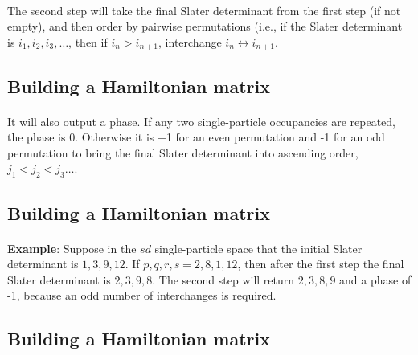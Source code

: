 \paragraph{}
The second step will take the final Slater determinant 
from the first step (if not empty),
and then order by pairwise permutations (i.e., if the Slater determinant is
$i_1, i_2, i_3, \ldots$, then if $i_n > i_{n+1}$, interchange 
$i_n \leftrightarrow i_{n+1}$.



\subsection*{Building a Hamiltonian matrix}

\paragraph{}

It will also output a phase.  If any two single-particle occupancies are repeated, 
the phase is
0.  Otherwise it is +1 for an even permutation and -1 for an odd permutation to 
bring the final
Slater determinant into ascending order, $j_1 < j_2 < j_3 \ldots$.



\subsection*{Building a Hamiltonian matrix}

\paragraph{}
\textbf{Example}: Suppose in the $sd$ single-particle space that the initial 
Slater determinant
is $1,3,9,12$. If $p,q,r,s = 2,8,1,12$, then after the first step the final Slater determinant
is $2,3,9,8$.  The second step will return $2,3,8,9$ and a phase of -1, 
because an odd number  of interchanges is required.



\subsection*{Building a Hamiltonian matrix}


